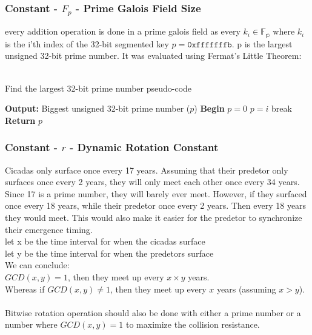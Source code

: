 \documentclass[fleqn, a4paper,12pt]{article}
\begin{document}
\subsubsection{Constant - $F_p$ - Prime Galois Field Size}

every addition operation is done in a prime galois field as every $k_i \in \mathbb{F_p}$ where $k_i$ is the i'th index of the 32-bit segmented key $p = \texttt{0xfffffffb}$. p is the largest unsigned 32-bit prime number. It was evaluated using Fermat's Little Theorem:\\
\\
\begin{algorithm}[H] %
\caption{Find the largest 32-bit prime number pseudo-code}
\begin{algorithmic}[1]  %
\State \textbf{Output:} Biggest unsigned 32-bit prime number ($p$)
\State \textbf{Begin}
\State $p = 0$
		\State $p = i$
		\State break
	\EndIf
\EndFor
\State \textbf{Return} $p$
\end{algorithmic}
\end{algorithm}

\subsubsection{Constant - $r$ - Dynamic Rotation Constant} \label{rotation_constant}

Cicadas only surface once every 17 years. Assuming that their predetor only surfaces once every 2 years, they will only meet each other once every 34 years. Since 17 is a prime number, they will barely ever meet. However, if they surfaced once every 18 years, while their predetor once every 2 years. Then every 18 years they would meet. This would also make it easier for the predetor to synchronize their emergence timing.\\
let x be the time interval for when the cicadas surface \\
let y be the time interval for when the predetors surface \\
We can conclude:\\
$GCD(x,y) = 1$, then they meet up every $x \times y$ years. \\
Whereas if $GCD(x,y) \neq 1$, then they meet up every $x$ years (assuming $x > y$). \\
\\
Bitwise rotation operation should also be done with either a prime number or a number where $GCD(x,y) = 1$ to maximize the collision resistance.\\
\end{document}
